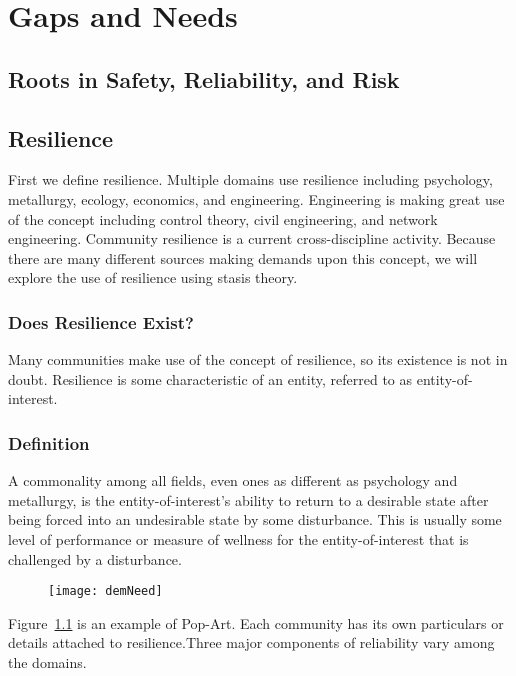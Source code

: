 
\renewcommand{\thechapter}{2}

\chapter{Gaps and Needs}

\section{Roots in Safety, Reliability, and Risk}

\section{Resilience}
First we define resilience. Multiple domains use resilience including
psychology, metallurgy, ecology, economics, and
engineering. Engineering is making great use of the concept including
control theory, civil engineering, and network engineering. Community
resilience is a current cross-discipline activity. Because there are
many different sources making demands upon this concept, we will
explore the use of resilience using stasis theory.

\subsection{Does Resilience Exist?}

Many communities make use of the concept of resilience, so its
existence is not in doubt. Resilience is some characteristic of an
entity, referred to as entity-of-interest. 

\subsection{Definition}

A commonality among all fields, even ones as different as
psychology and metallurgy, is the entity-of-interest's ability to
return to a desirable state after being forced into an undesirable
state by some disturbance. This is usually some level of performance
or measure of wellness for the entity-of-interest that is challenged
by a disturbance.

\begin{figure} 
  \centering
  \texttt{[image: demNeed]}
  \label{fig:res}
\end{figure}
Figure~\ref{fig:res} is an example of Pop-Art.
Each community has its own particulars or details attached to
resilience.Three major components of reliability vary among the domains. 

